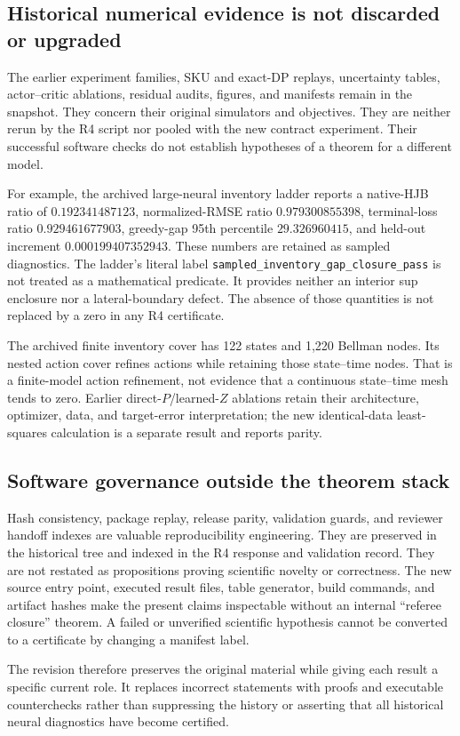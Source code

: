 \subsection{Historical numerical evidence is not discarded or upgraded}
The earlier experiment families, SKU and exact-DP replays, uncertainty tables, actor--critic ablations, residual audits, figures, and manifests remain in the snapshot. They concern their original simulators and objectives. They are neither rerun by the R4 script nor pooled with the new contract experiment. Their successful software checks do not establish hypotheses of a theorem for a different model.

For example, the archived large-neural inventory ladder reports a native-HJB ratio of $0.192341487123$, normalized-RMSE ratio $0.979300855398$, terminal-loss ratio $0.929461677903$, greedy-gap 95th percentile $29.326960415$, and held-out increment $0.000199407352943$. These numbers are retained as sampled diagnostics. The ladder's literal label \texttt{sampled\_inventory\_gap\_closure\_pass} is not treated as a mathematical predicate. It provides neither an interior sup enclosure nor a lateral-boundary defect. The absence of those quantities is not replaced by a zero in any R4 certificate.

The archived finite inventory cover has 122 states and 1,220 Bellman nodes. Its nested action cover refines actions while retaining those state--time nodes. That is a finite-model action refinement, not evidence that a continuous state--time mesh tends to zero. Earlier direct-$P$/learned-$Z$ ablations retain their architecture, optimizer, data, and target-error interpretation; the new identical-data least-squares calculation is a separate result and reports parity.

\subsection{Software governance outside the theorem stack}
Hash consistency, package replay, release parity, validation guards, and reviewer handoff indexes are valuable reproducibility engineering. They are preserved in the historical tree and indexed in the R4 response and validation record. They are not restated as propositions proving scientific novelty or correctness. The new source entry point, executed result files, table generator, build commands, and artifact hashes make the present claims inspectable without an internal ``referee closure'' theorem. A failed or unverified scientific hypothesis cannot be converted to a certificate by changing a manifest label.

The revision therefore preserves the original material while giving each result a specific current role. It replaces incorrect statements with proofs and executable counterchecks rather than suppressing the history or asserting that all historical neural diagnostics have become certified.


